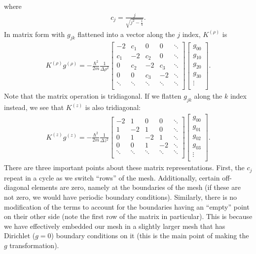\documentclass[12pt]{article}
\numberwithin{equation}{section}
\begin{document}
where
\begin{align*}
c_j = \frac{j}{\sqrt{j^2-\frac{1}{4}}}.
\end{align*}
In matrix form with $g_{jk}$ flattened into a vector along the $j$ index, $K^{(\rho)}$ is
\begin{align*}
K^{(\rho)}g^{(\rho)} = -\frac{\hbar^2}{2m} \frac{1}{\Delta \rho^2}\begin{bmatrix}
-2 & c_1 & 0 & 0 & \ddots \\
c_1 & -2 & c_2 & 0  & \ddots \\
0 & c_2 & -2 & c_3  & \ddots \\
0 & 0 & c_3 & -2 & \ddots \\
\ddots & \ddots & \ddots & \ddots & \ddots \\
\end{bmatrix}
\begin{bmatrix}
g_{00} \\
g_{10} \\
g_{20} \\
g_{30} \\
\vdots \\
\end{bmatrix}.
\end{align*}
Note that the matrix operation is tridiagonal. If we flatten $g_{jk}$ along the $k$ index instead, we see that $K^{(z)}$ is also tridiagonal:
\begin{align*}
K^{(z)}g^{(z)} = -\frac{\hbar^2}{2m} \frac{1}{\Delta z^2}\begin{bmatrix}
-2 & 1 & 0 & 0 & \ddots \\
1 & -2 & 1 & 0  & \ddots \\
0 & 1 & -2 & 1  & \ddots \\
0 & 0 & 1 & -2 & \ddots \\
\ddots & \ddots & \ddots & \ddots & \ddots \\
\end{bmatrix}
\begin{bmatrix}
g_{00} \\
g_{01} \\
g_{02} \\
g_{03} \\
\vdots \\
\end{bmatrix}.
\end{align*}
There are three important points about these matrix representations. First, the $c_j$ repeat in a cycle as we switch ``rows'' of the mesh. Additionally, certain off-diagonal elements are zero, namely at the boundaries of the mesh (if these are not zero, we would have periodic boundary conditions). Similarly, there is no modification of the terms to account for the boundaries having an ``empty'' point on their other side (note the first row of the matrix in particular). This is because we have effectively embedded our mesh in a slightly larger mesh that has Dirichlet ($g=0$) boundary conditions on it (this is the main point of making the $g$ transformation).
\end{document}
